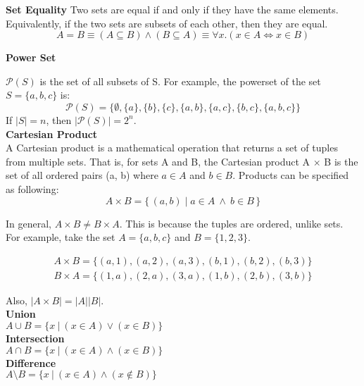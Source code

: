 \documentclass{article}
\numberwithin{theorem}{subsection}
\numberwithin{theorem}{subsubsection}
\numberwithin{lemma}{subsection}
\numberwithin{lemma}{subsubsection}
\theoremstyle{definition}
\numberwithin{definition}{subsection}
\numberwithin{definition}{subsubsection}
\begin{document}
\noindent \textbf{Set Equality}
\indent Two sets are equal if and only if they have the same elements. Equivalently, if the two sets are subsets of each other, then they are equal.
\begin{equation*}
    A = B \equiv (A \subseteq B) \land (B \subseteq A) \equiv \forall x.(x \in A \iff x \in B)
\end{equation*}

\noindent \textbf{Power Set}

$\mathcal{P}(S)$ is the set of all subsets of S. For example, the powerset of the set $S = \{a,b,c\}$ is:
\begin{equation*}
    \mathcal{P}(S) = \{\emptyset, \{a\}, \{b\}, \{c\}, \{a,b\}, \{a,c\}, \{b,c\}, \{a,b,c\}\}
\end{equation*}
\noindent If $|S| = n$, then $|\mathcal{P}(S)| = 2^{n}$. \\

\noindent \textbf{Cartesian Product} \\
\indent A Cartesian product is a mathematical operation that returns a set of tuples from multiple sets. That is, for sets A and B, the Cartesian product A $\times$ B is the set of all ordered pairs (a, b) where $a \in A$ and $b \in B$. Products can be specified as following:
\begin{equation*}
    A\times B = \{\,(a,b)\mid a\in A \ \land \ b\in B\,\}
\end{equation*}

\noindent In general, $A \times B \neq B \times A$. This is because the tuples are ordered, unlike sets. For example, take the set $A = \{a,b,c\}$ and $B = \{1,2,3\}$.

\begin{gather*}
    A \times B = \{(a,1),(a,2),(a,3),(b,1),(b,2),(b,3)\} \\
    B \times A = \{(1,a),(2,a),(3,a),(1,b),(2,b),(3,b)\}
\end{gather*}

\noindent Also, $|A \times B| = |A||B|$. \\

\noindent \textbf{Union} \\
\indent $A \cup B = \{x\ |\ (x \in A) \lor (x \in B)\}$ \\

\noindent \textbf{Intersection} \\
\indent $A \cap B = \{x\ |\ (x \in A) \land (x \in B)\}$ \\

\noindent \textbf{Difference} \\
\indent $A \setminus B = \{x\ |\ (x \in A) \land (x \notin B)\}$ \\
\end{document}
